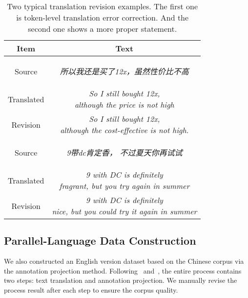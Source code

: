 \documentclass[11pt]{article}
\begin{document}
\begin{table}[!h]
\fontsize{9}{11.5}\selectfont
    \centering
\begin{tabular}{cc} 
  \hline
  Item & Text \\
  \hline
  Source&    \begin{CJK*}{UTF8}{gbsn}
\textit{所以我还是买了12x，虽然性价比不高}\end{CJK*} \\
  Translated &       \makecell[c]{\textit{So I still bought 12x,} \\ \textit{although the \textcolor{winered}{price} is not high}}\\
  Revision & \makecell[c]{\textit{So I still bought 12x,} \\ \textit{ although the \textcolor{mygreen}{cost-effective} is not high.}} \\
  \hline
  Source &  \begin{CJK*}{UTF8}{gbsn}
\textit{9带dc肯定香， 不过夏天你再试试} \end{CJK*} \\
  Translated &       \makecell[c]{\textit{9 with DC is definitely} \\ \textit{\textcolor{winered}{fragrant}, \textcolor{winered}{but you try } again in summer }}\\
  Revision &       \makecell[c]{\textit{9 with DC is definitely} \\ \textit{\textcolor{mygreen}{nice}, \textcolor{mygreen}{but you could try it } again in summer }}\\
  \hline  
  \end{tabular}
  \caption{
  Two typical translation revision examples.
  The first one is token-level translation error correction.
  And the second one shows a more proper statement.
  }
  \label{table:trainslate-error}
  \end{table}
 
\subsection{Parallel-Language Data Construction}
We also constructed an English version dataset based on the Chinese corpus via the annotation projection method.
Following~\citet{fei-etal-2020-cross} and~\citet{zhen-etal-2021-chinese}, the entire process contains two steps: text translation and annotation projection.
We manually revise the process result after each step to ensure the corpus quality.
\end{document}
